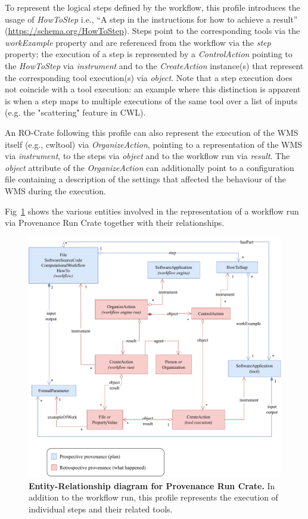 \documentclass[10pt,letterpaper]{article}
\begin{document}
To represent the logical steps defined by the workflow, this profile introduces the usage of \emph{HowToStep} i.e., “A step in the instructions for how to achieve a result” (\url{https://schema.org/HowToStep}).
Steps point to the corresponding tools via the \emph{workExample} property and are referenced from the workflow via the \emph{step} property; the execution of a step is represented by a \emph{ControlAction} pointing to the
\emph{HowToStep} via \emph{instrument} and to the \emph{CreateAction}
instance(s) that represent the corresponding tool execution(s) via
\emph{object}.
Note that a step execution does not coincide with a tool execution: an example where this distinction is apparent is when a step maps to multiple executions of the same tool over a list of inputs (e.g. the "scattering" feature in CWL).

An RO-Crate following this profile can also represent the execution of the WMS itself (e.g., cwltool) via
\emph{OrganizeAction}, pointing to a representation of the WMS via
\emph{instrument}, to the steps via \emph{object} and to the workflow run via \emph{result}.
The \emph{object} attribute of the
\emph{OrganizeAction} can additionally point to a configuration file containing a description of the settings that affected the behaviour of the WMS during the execution.

Fig~\ref{fig:provenance_crate_er} shows the various entities involved in the representation of a workflow run via Provenance Run Crate together with their relationships.

\begin{figure}[!h]
\includegraphics[width=\textwidth]{wrroc-figure3.drawio.pdf}
\caption{{\bf Entity-Relationship diagram for Provenance Run Crate.}
In addition to the workflow run, this profile represents the execution of individual steps and their related tools.}
\label{fig:provenance_crate_er}
\end{figure}
\end{document}
